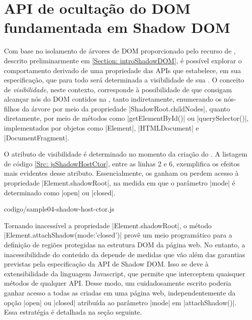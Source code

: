 
\section{API de ocultação do DOM fundamentada em Shadow DOM}

Com base no isolamento de árvores de DOM proporcionado pelo recurso de , descrito preliminarmente em \ref{Section: introShadowDOM}, é possível explorar o comportamento derivado de uma propriedade das APIs que estabelece, em sua especificação, que para todo  será determinada a visibilidade de sua . O conceito de \textit{visibilidade}, neste contexto, corresponde à possibilidade de que {\scripts} consigam alcançar nós do DOM contidos na , tanto indiretamente, enumerando os nós-filhos da árvore por meio da propriedade |ShadowRoot.childNodes|, quanto diretamente, por meio de métodos como |getElementById()| ou |querySelector()|, implementados por objetos como |Element|, |HTMLDocument| e |DocumentFragment|.

O atributo de visibilidade é determinado no momento da criação do . A listagem de código \ref{Src: jsShadowHostCtor}, entre as linhas 2 e 6, exemplifica os efeitos mais evidentes desse atributo. Essencialmente, os {\scripts} ganham ou perdem acesso à propriedade |Element.shadowRoot|, na medida em que o parâmetro |mode| é determinado como |open| ou |closed|.


	{codigo/sample04-shadow-host-ctor.js}

Tornando inacessível a propriedade |Element.shadowRoot|, o método |Element.attachShadow({mode:'closed'})| provê um meio programático para a definição de regiões protegidas na estrutura DOM da página web. No entanto, a inacessibilidade do conteúdo da  depende de medidas que vão além das garantias previstas pela especificação da API de Shadow DOM. Isso se deve à extensibilidade da linguagem Javascript, que permite que {\scripts} interceptem quaisquer métodos de qualquer API. Desse modo, um {\script} cuidadosamente escrito poderia ganhar acesso a todas as  criadas em uma página web, independentemente da opção |open| ou |closed| atribuída ao parâmetro |mode| em |attachShadow()|. Essa estratégia é detalhada na seção seguinte. %

